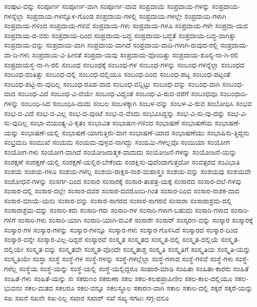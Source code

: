 {ಸಂಪುಟ-ವನ್ನು
ಸಂಪೂರ್ಣ
ಸಂಪೂರ್ಣ-ವಾಗಿ
ಸಂಪೂರ್ಣ-ವಾದ
ಸಂಪ್ರದಾಯ
ಸಂಪ್ರದಾಯ-ಗಳನ್ನು
ಸಂಪ್ರದಾಯ-ಗಳನ್ನೆಲ್ಲಾ
ಸಂಪ್ರದಾಯ-ಗಳನ್ನೊಳ-ಗೊಂಡ
ಸಂಪ್ರದಾಯ-ಗಳಲ್ಲಿ
ಸಂಪ್ರದಾಯ-ಗಳಲ್ಲೇ
ಸಂಪ್ರದಾಯ-ಗಳಾಗಿ
ಸಂಪ್ರದಾಯ-ಗಳಿಂದ
ಸಂಪ್ರದಾಯ-ಗಳಿವೆ
ಸಂಪ್ರದಾಯ-ಗಳು
ಸಂಪ್ರದಾಯ-ಗಳೂ
ಸಂಪ್ರದಾಯ-ಗಳೇ
ಸಂಪ್ರದಾ-ಯದ
ಸಂಪ್ರದಾಯ-ದ-ವರು
ಸಂಪ್ರದಾಯ-ದಿಂದ
ಸಂಪ್ರದಾಯ-ಬದ್ಧ
ಸಂಪ್ರದಾಯ-ಬದ್ಧತೆ
ಸಂಪ್ರದಾಯ-ಬದ್ಧ-ವಾಗಿತ್ತು
ಸಂಪ್ರದಾಯ-ವನ್ನು
ಸಂಪ್ರದಾಯ-ವಾಗಿ
ಸಂಪ್ರದಾಯ-ವಾಗಿದೆ
ಸಂಪ್ರದಾಯ-ವಾದಿ-ಗಳಾಗಿ-ರುವುದ-ರಲ್ಲಿ
ಸಂಪ್ರದಾಯ-ವಾ-ದಿ-ಗಳು
ಸಂಪ್ರದಾಯ-ವಿ-ಹೀನತೆ
ಸಂಪ್ರದಾ-ಯವು
ಸಂಪ್ರದಾಯ-ವೊಂದಿತ್ತು
ಸಂಪ್ರದಾಯ-ಶೂನ್ಯ-ನಾ-ಗಿ-ರಲಿ
ಸಂಪ್ರದಾಯಸ್ಥ-ನಾ-ಗಿ-ರಲಿ
ಸಂಬಂಧ
ಸಂಬಂಧಕ್ಕೆ
ಸಂಬಂಧ-ಗಳ
ಸಂಬಂಧ-ಗಳನ್ನು
ಸಂಬಂಧ-ಗಳನ್ನೆಲ್ಲಾ
ಸಂಬಂಧದ
ಸಂಬಂಧ-ದಂತಿತ್ತು
ಸಂಬಂಧ-ದಲ್ಲಿ
ಸಂಬಂಧ-ದಲ್ಲಿಯೂ
ಸಂಬಂಧ-ದಿಂದ
ಸಂಬಂಧ-ಪಟ್ಟ
ಸಂಬಂಧ-ಪಟ್ಟಂತೆ
ಸಂಬಂಧ-ಪಟ್ಟಿ-ರು-ವುದಿಲ್ಲ
ಸಂಬಂಧ-ರೂಪ-ವಾದ
ಸಂಬಂಧ-ವನ್ನಿಟ್ಟು
ಸಂಬಂಧ-ವನ್ನು
ಸಂಬಂಧ-ವಾಗಿ
ಸಂಬಂಧ-ವಾದ
ಸಂಬಂಧ-ವಿದೆ
ಸಂಬಂಧ-ವಿ-ದೆಯೇ
ಸಂಬಂಧ-ವಿದ್ದಂತೆ
ಸಂಬಂಧ-ವಿ-ರುವ-ವರೆಗೆ
ಸಂಬಂಧವೂ
ಸಂಬಂಧಾದಿ-ಗಳನ್ನು
ಸಂಬಂಧಿ-ಸಿದ
ಸಂಬಂಧಿಸಿ-ದುದು
ಸಂಬಲ
ಸಂಬಳಕ್ಕಾಗಿ
ಸಂಬಳ-ವನ್ನು
ಸಂಬಳ-ವಿ-ರುವ
ಸಂಬೋಧಿಸಿ
ಸಂಭವ
ಸಂಭ-ವ-ವಿದೆ
ಸಂಭ-ವ-ವಿಲ್ಲ
ಸಂಭ-ವ-ವುಂಟೆ
ಸಂಭ-ವ-ವೆಂದು
ಸಂಭವಿಸಿದ್ದನ್ನು
ಸಂಭ-ವಿ-ಸು-ವು-ದನ್ನು
ಸಂಭ-ವಿ-ಸು-ವುದಿಲ್ಲ
ಸಂಭಾ-ವಯಂತ್ಯ-ವಿ-ಕೃತಂ
ಸಂಭಾವಿತ
ಸಂಭಾಷಣ-ಗಳಿಂದ
ಸಂಭಾಷಣೆ
ಸಂಭಾಷಣೆಯ
ಸಂಭಾಷಣೆ-ಯನ್ನು
ಸಂಭಾಷಣೆ-ಯಲ್ಲಿ
ಸಂಭಾಷಣೆ-ಯಾಗುತ್ತಿರು-ವಾಗ
ಸಂಭಾಷಣೆ-ಯಾದ
ಸಂಭಾಷಣೆಯು
ಸಂಭಾಷಿಸು-ತ್ತಿದ್ದನು
ಸಂಭ್ರಮದಿ
ಸಂಮುಖೆ
ಸಂಯಮ
ಸಂಯಮ-ವುಳ್ಳವ-ನಾಗಿದ್ದು
ಸಂಯಮಿ-ಗಳಲ್ಲವೊ
ಸಂಯಿಯಾ
ಸಂಯೋಗ
ಸಂಯೋಗ-ಗಳು
ಸಂಯೋಗ-ವಾಗಿದೆ
ಸಂಯೋಜನಾತ್ಮಕ-ವಾದುದು
ಸಂಯೋಜನೆ-ಗಳನ್ನು
ಸಂಯೋಜನೆ-ಯನ್ನು
ಸಂರಕ್ಷಣೆ
ಸಂರಕ್ಷಣೆ-ಯಲ್ಲಿ
ಸಂರಕ್ಷಣೆ-ಯಲ್ಲಿರ-ಬೇಕೆಂದು
ಸಂರಕ್ಷಿಸು-ವುದೆಂದಾಗುತ್ತದೋ
ಸಂವತ್ಸರದ
ಸಂವಿಭಾತಿ
ಸಂಶಯ
ಸಂಶಯ-ಗಳೂ
ಸಂಶಯ-ಗಳೆಲ್ಲ
ಸಂಶಯ-ರಾಕ್ಷಸ-ನಾಶ-ಮಹಾಸ್ತ್ರಂ
ಸಂಶಯ-ವನ್ನು
ಸಂಶಯವು
ಸಂಶಯವೇ
ಸಂಶೋಧನೆ-ಗಳನ್ನು
ಸಂಸರ್ಗ-ದಿಂದ
ಸಂಸಾರ
ಸಂಸಾರಕ್ಕೆ
ಸಂಸಾರ-ತಾಪತ್ರ-ಯಕ್ಕೆ
ಸಂಸಾರದ
ಸಂಸಾರ-ದಲೆ-ಗಳವು
ಸಂಸಾರ-ದಲ್ಲಿ
ಸಂಸಾರ-ದಲ್ಲೇ
ಸಂಸಾರ-ದವರ
ಸಂಸಾರ-ದವರೊಂದಿ-ಗಿಂತ
ಸಂಸಾರ-ದಿಂದ
ಸಂಸಾರ-ನಾಶಕ-ವಾದ
ಸಂಸಾರ-ಮಾಯೆ-ಯನು
ಸಂಸಾರ-ವನ್ನು
ಸಂಸಾರ-ಸಾಗರದ
ಸಂಸಾರ-ಸಾಗರವೆ
ಸಂಸಾರಾ
ಸಂಸಾರಾಶ್ರಮ-ದಲ್ಲಿ
ಸಂಸಾರಾಶ್ರಮ-ವನ್ನು
ಸಂಸಾರಿ-ಕರು
ಸಂಸಾರಿ-ಗರು
ಸಂಸಾರಿ-ಗಳ
ಸಂಸಾರಿ-ಗಳಾಗ-ಬಹುದು
ಸಂಸಾರಿ-ಗಳಾದ
ಸಂಸಾರಿ-ಗಳಿಗೆ
ಸಂಸಾರಿ-ಗಳು
ಸಂಸಾರಿ-ಯಾಗಿ
ಸಂಸಾರಿ-ಯಾಗಿ-ರುವಿಕೆ
ಸಂಸಾರೇ
ಸಂಸಾರ್
ಸಂಸ್ಕರಣ-ವನ್ನು
ಸಂಸ್ಕಾರ
ಸಂಸ್ಕಾರಕ್ಕೆ
ಸಂಸ್ಕಾರ-ಗಳ
ಸಂಸ್ಕಾರ-ಗಳನ್ನು
ಸಂಸ್ಕಾರ-ಗಳನ್ನೂ
ಸಂಸ್ಕಾರ-ಗಳು
ಸಂಸ್ಕಾರ-ಗೊಳಿಸಿದೆ
ಸಂಸ್ಕಾರದ
ಸಂಸ್ಕಾರ-ದಿಂದ
ಸಂಸ್ಕಾರ-ವನ್ನೇ
ಸಂಸ್ಕಾರ-ವಿಲ್ಲ-ದಿದ್ದರೆ
ಸಂಸ್ಕಾರವೆ
ಸಂಸ್ಕೃತ
ಸಂಸ್ಕೃತದ
ಸಂಸ್ಕೃತ-ದಲ್ಲಿ
ಸಂಸ್ಕೃತ-ದಲ್ಲಿಯೆ
ಸಂಸ್ಕೃತ-ದಲ್ಲಿಯೇ
ಸಂಸ್ಕೃತ-ವನ್ನು
ಸಂಸ್ಕೃತವೇ
ಸಂಸ್ಕೃತ-ವೊಂದೇ
ಸಂಸ್ಕೃತಾಶ್ಚ
ಸಂಸ್ಕೃತಿ
ಸಂಸ್ಕೃತಿಗೆ
ಸಂಸ್ಕೃತಿಯ
ಸಂಸ್ಕೃತಿ-ಯನ್ನು
ಸಂಸ್ಕೃತಿಯೇ
ಸಂಸ್ಥಾ
ಸಂಸ್ಥೆ
ಸಂಸ್ಥೆ-ಗಳ
ಸಂಸ್ಥೆ-ಗಳನ್ನು
ಸಂಸ್ಥೆ-ಗಳಲ್ಲೆಲ್ಲಾ
ಸಂಸ್ಥೆ-ಗಳಾದ
ಸಂಸ್ಥೆ-ಗಳಿವೆ
ಸಂಸ್ಥೆ-ಗಳು
ಸಂಸ್ಥೆ-ಗಳೆಲ್ಲ
ಸಂಸ್ಥೆಯ
ಸಂಸ್ಥೆ-ಯನ್ನು
ಸಂಸ್ಥೆ-ಯಲ್ಲಿ
ಸಂಸ್ಥೆ-ಯಲ್ಲಿದ್ದರೂ
ಸಂಹಾರ-ಮಾಡಿ
ಸಂಹಿತಾ
ಸಂಹಿತಾ-ಕಾರರು
ಸಂಹಿತೆ
ಸಂಹಿತೆ-ಗಳು
ಸಂಹಿತೆ-ಯನ್ನು
ಸಃ
ಸಕರುಣಂ
ಸಕರುಣಾ
ಸಕಲ
ಸಕಲ-ಕಲಹಪ್ರಾಪಿಣೀಂ
ಸಕಲ-ಕಾಲ-ದಲ್ಲಿಯೂ
ಸಕಲ-ಭುವನಂ
ಸಕಲ-ಮತದ
ಸಕಲರೂ
ಸಕಲ-ವನ್ನೂ
ಸಕಲಸ್ಥೂಲ
ಸಕಾರಣ-ವಾಗಿ
ಸಕಾಲ
ಸಕಾಲ-ದಲ್ಲಿ
ಸಕ್ಕರೆ
ಸಕ್ಕರೆ-ಯನ್ನು
ಸಖ
ಸಖನೆ
ಸಖನೇ
ಸಖ-ರಿಲ್ಲ
ಸಖಾರ
ಸಖಾರ್
ಸಖೆ
ಸಖ್ಯ
ಸಗಟು
ಸಗ್ಗ-ವನೂ
}
